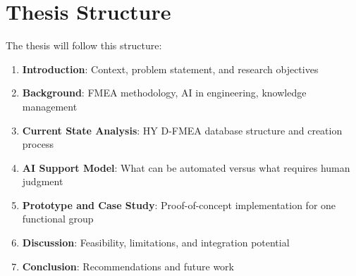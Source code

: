 
\section{Thesis Structure}

The thesis will follow this structure:

\begin{enumerate}
    \item \textbf{Introduction}: Context, problem statement, and research objectives
    \item \textbf{Background}: FMEA methodology, AI in engineering, knowledge management
    \item \textbf{Current State Analysis}: HY D-FMEA database structure and creation process
    \item \textbf{AI Support Model}: What can be automated versus what requires human judgment
    \item \textbf{Prototype and Case Study}: Proof-of-concept implementation for one functional group
    \item \textbf{Discussion}: Feasibility, limitations, and integration potential
    \item \textbf{Conclusion}: Recommendations and future work
\end{enumerate}
